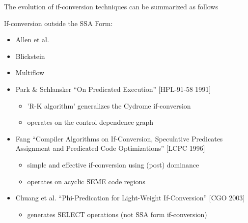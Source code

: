 The evolution of if-conversion
techniques can be summarized as follows

If-conversion outside the SSA Form:
\begin{itemize}

\item Allen et al.

\item Blickstein

\item Multiflow

\item Park \& Schlansker ``On Predicated Execution'' [HPL-91-58 1991]
\begin{itemize}
\item 'R-K algorithm' generalizes the Cydrome if-conversion
\item operates on the control dependence graph
\end{itemize}

\item Fang ``Compiler Algorithms on If-Conversion, Speculative Predicates
Assignment and Predicated Code Optimizations'' [LCPC 1996]
\begin{itemize}
\item simple and effective if-conversion using (post) dominance
\item operates on acyclic SEME code regions
\end{itemize}

\item Chuang et al. ``Phi-Predication for Light-Weight If-Conversion'' [CGO
2003]
\begin{itemize}
\item generates SELECT operations (not SSA form if-conversion)
\end{itemize}

\end{itemize}

